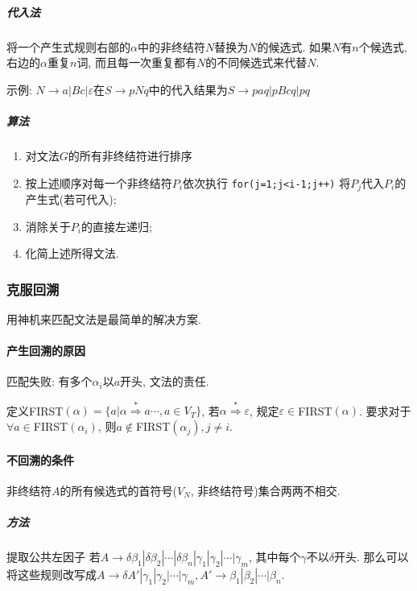                 \subparagraph{代入法}

                    将一个产生式规则右部的$\alpha$中的非终结符$N$替换为$N$的候选式. 如果$N$有$n$个候选式, 右边的$\alpha$重复$n$词, 而且每一次重复都有$N$的不同候选式来代替$N$.

                    示例: $N\to a|Bc|\varepsilon$在$S\to pNq$中的代入结果为$S\to paq|pBcq|pq$

                \subparagraph{算法}

                    \begin{enumerate}
                        \item 对文法$G$的所有非终结符进行排序
                        \item 按上述顺序对每一个非终结符$P_i$依次执行
                                \texttt{for(j=1;j<i-1;j++)}
                                将$P_j$代入$P_i$的产生式(若可代入);
                        \item 消除关于$P_i$的直接左递归;
                        \item 化简上述所得文法.
                    \end{enumerate}

        \subsubsection{克服回溯}

            用神机来匹配文法是最简单的解决方案.

            \paragraph{产生回溯的原因}

                匹配失败: 有多个$\alpha_i$以$a$开头, 文法的责任.

            定义FIRST$(\alpha)=\{a|\alpha\stackrel{*}{\Rightarrow}a\cdots, a\in V_T\}$, 若$\alpha\stackrel{*}{\Rightarrow}\varepsilon$, 规定$\varepsilon\in$FIRST$(\alpha)$. 要求对于$\forall a\in$FIRST$(\alpha_i)$, 则$a\not\in$FIRST$(\alpha_j), j\neq i$.

            \paragraph{不回溯的条件}

                非终结符$A$的所有候选式的首符号($V_N$, 非终结符号)集合两两不相交.

                \subparagraph{方法} \textsf{提取公共左因子}
                    若$A\to\delta\beta_1|\delta\beta_2|\cdots|\delta\beta_n|\gamma_1|\gamma_2|\cdots|\gamma_m$, 其中每个$\gamma$不以$\delta$开头. 那么可以将这些规则改写成$A\to\delta A'|\gamma_1|\gamma_2|\cdots|\gamma_m, A'\to\beta_1|\beta_2|\cdots|\beta_n$.


